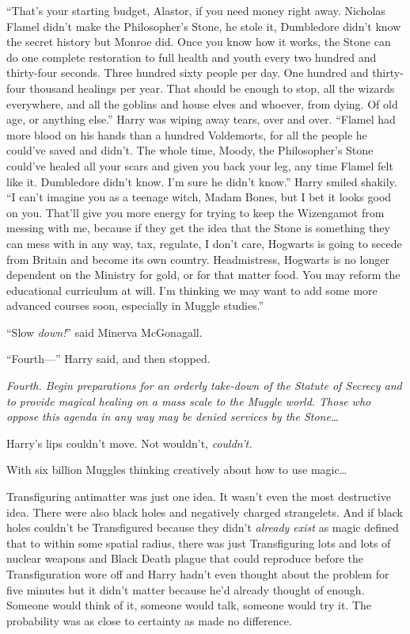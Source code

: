 “That’s your starting budget, Alastor, if you need money right away. Nicholas Flamel didn’t make the Philosopher’s Stone, he stole it, Dumbledore didn’t know the secret history but Monroe did. Once you know how it works, the Stone can do one complete restoration to full health and youth every two hundred and thirty-four seconds. Three hundred sixty people per day. One hundred and thirty-four thousand healings per year. That should be enough to stop, all the wizards everywhere, and all the goblins and house elves and whoever, from dying. Of old age, or anything else.” Harry was wiping away tears, over and over. “Flamel had more blood on his hands than a hundred Voldemorts, for all the people he could’ve saved and didn’t. The whole time, Moody, the Philosopher’s Stone could’ve healed all your scars and given you back your leg, any time Flamel felt like it. Dumbledore didn’t know. I’m sure he didn’t know.” Harry smiled shakily. “I can’t imagine you as a teenage witch, Madam Bones, but I bet it looks good on you. That’ll give you more energy for trying to keep the Wizengamot from messing with me, because if they get the idea that the Stone is something they can mess with in any way, tax, regulate, I don’t care, Hogwarts is going to secede from Britain and become its own country. Headmistress, Hogwarts is no longer dependent on the Ministry for gold, or for that matter food. You may reform the educational curriculum at will. I’m thinking we may want to add some more advanced courses soon, especially in Muggle studies.”

“Slow \emph{down!}” said Minerva McGonagall.

“Fourth—” Harry said, and then stopped.

\emph{Fourth. Begin preparations for an orderly take-down of the Statute of Secrecy and to provide magical healing on a mass scale to the Muggle world. Those who oppose this agenda in any way may be denied services by the Stone…}

Harry’s lips couldn’t move. Not wouldn’t, \emph{couldn’t.}

With six billion Muggles thinking creatively about how to use magic…

Transfiguring antimatter was just one idea. It wasn’t even the most destructive idea. There were also black holes and negatively charged strangelets. And if black holes couldn’t be Transfigured because they didn’t \emph{already exist} as magic defined that to within some spatial radius, there was just Transfiguring lots and lots of nuclear weapons and Black Death plague that could reproduce before the Transfiguration wore off and Harry hadn’t even thought about the problem for five minutes but it didn’t matter because he’d already thought of enough. Someone would think of it, someone would talk, someone would try it. The probability was as close to certainty as made no difference.

